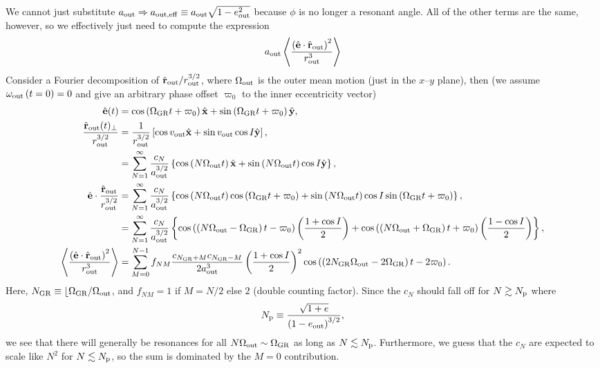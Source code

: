 \documentclass[10pt,
        usenames, %
        dvipsnames %
    ]{article}
\newcommand*{\bm}[1]{\boldsymbol{\mathbf{#1}}}
\newcommand*{\uv}[1]{\hat{\bm{#1}}}
\newcommand*{\ev}[1]{\left\langle#1\right\rangle}
\newcommand*{\p}[1]{\left(#1\right)}
\newcommand*{\s}[1]{\left[#1\right]}
\newcommand*{\z}[1]{\left\{#1\right\}}
\begin{document}
We cannot just substitute $a_{\rm out} \Rightarrow a_{\rm out, eff} \equiv
a_{\rm out}\sqrt{1 - e_{\rm out}^2}$ because $\phi$ is no longer a resonant
angle. All of the other terms are the same, however, so we effectively just need
to compute the expression
\begin{equation}
    a_{\rm out}\ev{\frac{\p{\uv{e} \cdot \uv{r}_{\rm out}}^2}{r_{\rm out}^3}}
\end{equation}
Consider a Fourier decomposition of $\uv{r}_{\rm out} / r_{\rm out}^{3/2}$,
where $\Omega_{\rm out}$ is the outer mean motion (just in the $x$--$y$ plane),
then (we assume $\omega_{\rm out}\p{t = 0} = 0$ and give an arbitrary phase
offset $\varpi_0$ to the inner eccentricity vector)
\begin{align}
    \uv{e}(t) &= \cos \p{\Omega_{\rm GR}t + \varpi_0} \uv{x} +
        \sin\p{\Omega_{\rm GR}t + \varpi_0}\uv{y},\\
    \frac{\uv{r}_{\rm out}(t)_{\perp}}{r_{\rm out}^{3/2}} &=
        \frac{1}{r_{\rm out}^{3/2}}\s{\cos v_{\rm out}
            \uv{x} + \sin v_{\rm out}\cos I \uv{y}},\\
        &= \sum\limits_{N = 1}^\infty
            \frac{c_N}{a_{\rm out}^{3/2}}\z{\cos\p{N \Omega_{\rm out}t} \uv{x}
            + \sin\p{N \Omega_{\rm out}t} \cos I\uv{y}},\\
    \uv{e} \cdot \frac{\uv{r}_{\rm out}}{r_{\rm out}^{3/2}}
        &= \sum\limits_{N = 1}^\infty
            \frac{c_N}{a_{\rm out}^{3/2}}
                \z{\cos\p{N \Omega_{\rm out}t} \cos\p{\Omega_{\rm GR}t +
                    \varpi_0}
            + \sin\p{N \Omega_{\rm out}t} \cos I \sin\p{\Omega_{\rm GR}t +
                \varpi_0}},\\
        &= \sum\limits_{N = 1}^\infty
            \frac{c_N}{a_{\rm out}^{3/2}}
                \z{
                    \cos\p{\p{N\Omega_{\rm out} - \Omega_{\rm GR}}t - \varpi_0}
                        \p{\frac{1 + \cos I}{2}}
                    + \cos\p{\p{N\Omega_{\rm out} + \Omega_{\rm GR}}t + \varpi_0}
                        \p{\frac{1 - \cos I}{2}}
                    },\\
    \ev{\frac{\p{\uv{e} \cdot \uv{r}_{\rm out}}^2}{r_{\rm out}^3}}
        &= \sum\limits_{M = 0}^{N - 1}
            f_{NM}
            \frac{c_{N_{\rm GR} + M}c_{N_{\rm GR} - M}}{2a_{\rm out}^3}
            \p{\frac{1 + \cos I}{2}}^2 \cos\p{\p{2N_{\rm GR}\Omega_{\rm out}
                - 2\Omega_{\rm GR}}t - 2\varpi_0}.
\end{align}
Here, $N_{\rm GR} \equiv \lfloor \Omega_{\rm GR} / \Omega_{\rm out}$, and
$f_{NM} = 1$ if $M = N / 2$ else $2$ (double counting factor). Since the $c_N$
should fall off for $N \gtrsim N_{\rm p}$ where
\begin{equation}
    N_{\rm p} \equiv \frac{\sqrt{1 + e}}{\p{1 - e_{\rm out}}^{3/2}},
\end{equation}
we see that there will generally be resonances for all $N\Omega_{\rm out} \sim
\Omega_{\rm GR}$ as long as $N \lesssim N_{\rm p}$. Furthermore, we guess that
the $c_{N}$ are expected to scale like $N^2$ for $N \lesssim N_{\rm p}$, so the
sum is dominated by the $M = 0$ contribution.
\end{document}
